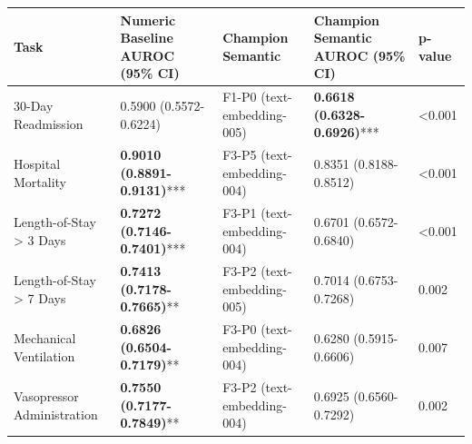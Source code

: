 \begin{tabular}{lllll}
\toprule
Task & Numeric Baseline AUROC (95\% CI) & Champion Semantic & Champion Semantic AUROC (95\% CI) & p-value \\
\midrule
30-Day Readmission & 0.5900 (0.5572-0.6224) & F1-P0 (text-embedding-005) & \textbf{0.6618 (0.6328-0.6926)}*** & <0.001 \\
Hospital Mortality & \textbf{0.9010 (0.8891-0.9131)}*** & F3-P5 (text-embedding-004) & 0.8351 (0.8188-0.8512) & <0.001 \\
Length-of-Stay \textgreater{} 3 Days & \textbf{0.7272 (0.7146-0.7401)}*** & F3-P1 (text-embedding-004) & 0.6701 (0.6572-0.6840) & <0.001 \\
Length-of-Stay \textgreater{} 7 Days & \textbf{0.7413 (0.7178-0.7665)}** & F3-P2 (text-embedding-005) & 0.7014 (0.6753-0.7268) & 0.002 \\
Mechanical Ventilation & \textbf{0.6826 (0.6504-0.7179)}** & F3-P0 (text-embedding-004) & 0.6280 (0.5915-0.6606) & 0.007 \\
Vasopressor Administration & \textbf{0.7550 (0.7177-0.7849)}** & F3-P2 (text-embedding-004) & 0.6925 (0.6560-0.7292) & 0.002 \\
\bottomrule
\end{tabular}
